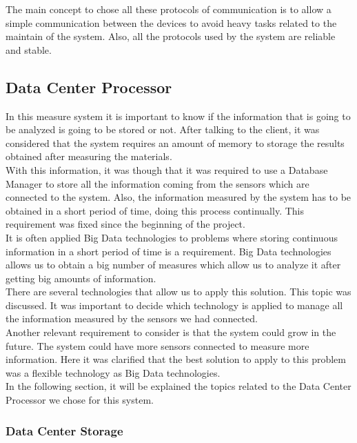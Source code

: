 The main concept to chose all these protocols of communication is to allow a simple communication between the devices to avoid heavy tasks related to the maintain of the system. Also, all the protocols used by the system are reliable and stable.

\subsection{Data Center Processor}

In this measure system it is important to know if the information that is going to be analyzed is going to be stored or not. After talking to the client, it was considered that the system requires an amount of memory to storage the results obtained after measuring the materials.\\

With this information, it was though that it was required to use a Database Manager to store all the information coming from the sensors which are connected to the system. Also, the information measured by the system has to be obtained in a short period of time, doing this process continually. This requirement was fixed since the beginning of the project.\\

It is often applied Big Data technologies to problems where storing continuous information in a short period of time is a requirement. Big Data technologies allows us to obtain a big number of measures which allow us to analyze it after getting big amounts of information.\\

There are several technologies that allow us to apply this solution. This topic was discussed. It was important to decide which technology is applied to manage all the information measured by the sensors we had connected.\\

Another relevant requirement to consider is that the system could grow in the future. The system could have more sensors connected to measure more information. Here it was clarified that the best solution to apply to this problem was a flexible technology as Big Data technologies.\\

In the following section, it will be explained the topics related to the Data Center Processor we chose for this system.

\subsubsection{Data Center Storage}

